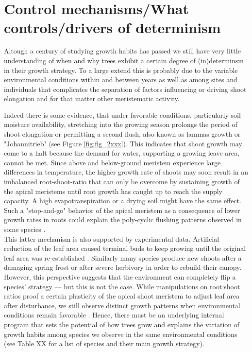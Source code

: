 \documentclass{article}
\begin{document}
\section*{Control mechanisms/What controls/drivers of determinism}
Altough a century of studying growth habits has passed we still have very little understanding of when and why trees exhibit a certain degree of (in)determinsm in their growth strategy. To a large extend this is probably due to the variable environmental conditions within and between years as well as among sites and individuals that complicates the separation of factors influencing or driving shoot elongation and for that matter other meristematic activity.

Indeed there is some evidence, that under favorable conditions, particularly soil moisture availability, stretching into the growing season prolongs the period of shoot elongation or permitting a second flush, also known as lammas growth or "Johannitrieb" (see Figure \ref{fig:fig_2xxx}). This indicates that shoot growth may come to a halt because the demand for water, supporting a growing leave area, cannot be met. Since above and below-ground meristem experience large differences in temperature, the higher growth rate of shoots may soon result in an imbalanced root-shoot-ratio that can only be overcome by sustaining growth of the apical meristems until root growth has caught up to reach the supply capacity. A high evapotranspiration or a drying soil might have the same effect. Such a "stop-and-go" behavior of the apical meristem as a  consequence of lower growth rates in roots could explain the poly-cyclic flushing patterns observed in some species \cite{girardPolycyclismFundamentalTree2011}.\\

This latter mechanism is also supported by experimental data. Artificial reduction of the leaf area caused terminal buds to keep growing until the original leaf area was re-established \citep{borchertSimulationRhythmicTree1973}. Similarly many species produce new shoots after a damaging spring frost or after severe herbivory in order to rebuild their canopy. \\

However, this perspective suggests that the environment can completely flip a species' strategy --- but this is not the case. While manipulations on root:shoot ratios proof a certain plasticity of the apical shoot meristem to adjust leaf area after disturbance, we still observe distinct growth patterns when environmental conditions remain favorable . Hence, there must be an underlying internal program that sets the potential of how trees grow and explains the variation of growth habits among species we observe in the same environmental conditions (see Table XX for a list of species and their main growth strategy). 
\end{document}
